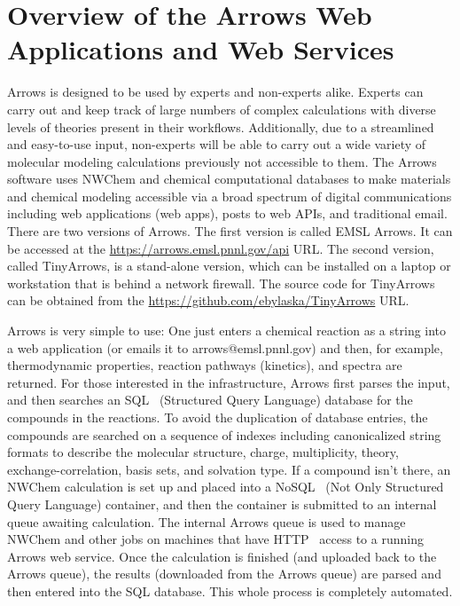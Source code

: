 \documentclass[runningheads,a4paper]{llncs}
\begin{document}
\section{Overview of the Arrows Web Applications and Web Services}
\label{sec:OverviewArrows}
Arrows is designed to be used by experts and non-experts alike.  Experts can carry out and keep track of large numbers of complex calculations with diverse levels of theories present in their workflows.  Additionally, due to a streamlined and easy-to-use input, non-experts will be able to carry out a wide variety of molecular modeling calculations previously not accessible to them.  The Arrows software uses NWChem and chemical computational databases to make materials and chemical modeling accessible via a broad spectrum of digital communications including web applications (web apps), posts to web APIs, and traditional email. There are two versions of Arrows.  The first version is called EMSL Arrows.  It can be accessed at the \url{https://arrows.emsl.pnnl.gov/api} URL.  The second version, called TinyArrows, is a stand-alone version, which can be installed on a laptop or workstation that is behind a network firewall.  The source code for TinyArrows can be obtained from the \url{https://github.com/ebylaska/TinyArrows} URL.


Arrows is very simple to use: One just enters a chemical reaction as a string into a web application (or emails it to arrows@emsl.pnnl.gov) and then, for example, thermodynamic properties, reaction pathways (kinetics), and spectra are returned.  For those interested in the infrastructure, Arrows first parses the input, and then searches an SQL~\cite{chamberlin1974sequel,hursch1988sql} (Structured Query Language) database for the compounds in the reactions. To avoid the duplication of database entries, the compounds are searched on a sequence of indexes including canonicalized string formats to describe the molecular structure, charge, multiplicity, theory, exchange-correlation, basis sets, and solvation type.  If a compound isn’t there, an NWChem calculation is set up and placed into a NoSQL~\cite{stonebraker2010sql} (Not Only Structured Query Language) container, and then the container is submitted to an internal queue awaiting calculation.  The internal Arrows queue is used to manage NWChem and other jobs on machines that have HTTP~\cite{fielding1999hypertext} access to a running Arrows web service.   Once the calculation is finished (and uploaded back to the Arrows queue), the results (downloaded from the Arrows queue) are parsed and then entered into the SQL database. This whole process is completely automated. 
\end{document}

